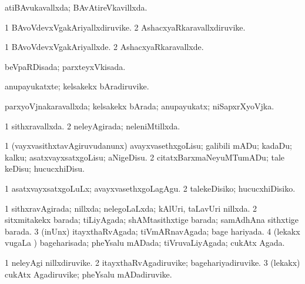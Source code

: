 {{\bentry
{} 
\gl{\gu}
\expl{}
\bmng
atiBAvukavallxda; BAvAtireVkavillxda. 
\emng
\eentry

\bentry
{} 
\gl{\nA}
\expl{}
\bmng
\bnum
\num{1} BAvoVdevxVgakAriyallxdiruvike. 
\num{2} AshacxyaRkaravallxdiruvike. 
\enum
\emng
\eentry

\bentry
{} 
\gl{\kirxvi}
\expl{}
\bmng
\bnum
\num{1} BAvoVdevxVgakAriyallxde. 
\num{2} AshacxyaRkaravallxde. 
\enum
\emng
\eentry

\bentry
{} 
\gl{\gu}
\expl{}
\bmng
beVpaRDisada; parxteyxVkisada. 
\emng
\eentry

\bentry
{} 
\gl{\nA}
\expl{}
\bmng
anupayukatxte; kelsakekx bAradiruvike. 
\emng
\eentry

\bentry
{} 
\gl{\gu}
\expl{}
\bmng
parxyoVjnakaravallxda; kelsakekx bArada; anupayukatx; niSapxrXyoVjka. 
\emng
\eentry

\bentry
{} 
\gl{\gu}
\expl{}
\bmng
\bnum
\num{1} sithxravallxda. 
\num{2} neleyAgirada; neleniMtillxda. 
\enum
\emng
\eentry

\bentry
{} 
\gl{\sakirx}
\expl{}
\bmng
\bnum
\num{1} (vayxvasithxtavAgiruvudanunx) avayxvasethxgoLisu; galibili mADu; kadaDu; kalku; asatxvayxsatxgoLisu; aNigeDisu. 
\num{2} citatxBarxmaNeyuMTumADu; tale keDisu; hucucxhiDisu. 
\enum
\emng

\noindent 
\gl{\akirx}
\expl{}
\bmng
\bnum
\num{1} asatxvayxsatxgoLuLx; avayxvasethxgoLagAgu. 
\num{2} talekeDisiko; hucucxhiDisiko. 
\enum
\emng
\eentry

\bentry
{} 
\gl{\gu}
\expl{}
\bmng
\bnum
\num{1} sithxravAgirada; nillxda; nelegoLaLxda; kAlUri, taLavUri nillxda. 
\num{2} sitxmitakekx barada; tiLiyAgada; shAMtasithxtige barada; samAdhAna sithxtige barada. 
\num{3} (inUnx) itayxthaRvAgada; tiVmARnavAgada; bage hariyada. 
\num{4} (lekakx \mo vugaLa \vi) bageharisada; pheYsalu mADada; tiVruvaLiyAgada; cukAtx Agada. 
\enum
\emng
\eentry

\bentry
{} 
\gl{\nA}
\expl{}
\bmng
\bnum
\num{1} neleyAgi nillxdiruvike. 
\num{2} itayxthaRvAgadiruvike; bagehariyadiruvike. 
\num{3} (lekakx) cukAtx Agadiruvike; pheYsalu mADadiruvike. 
\enum
\emng
\eentry

}}
